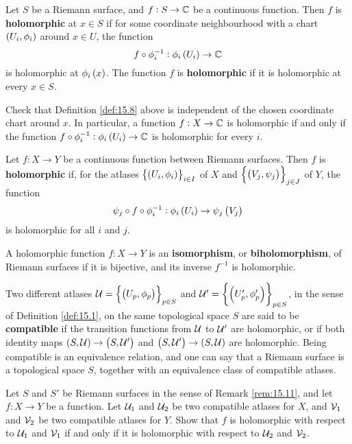 \begin{definition}
\label{def:15.8}
Let $ S $ be a Riemann surface, and $ f : S \to \mathbb{C} $ be a continuous function. Then $ f $ is \textbf{holomorphic} at $ x \in S $ if for some coordinate neighbourhood with a chart $ \br{U_i, \phi_i} $ around $ x \in U $, the function
$$ f \circ \phi_i^{-1} : \phi_i\br{U_i} \to \C $$
is holomorphic at $ \phi_i\br{x} $. The function $ f $ is \textbf{holomorphic} if it is holomorphic at every $ x \in S $.
\end{definition}

\begin{exercise}
Check that Definition \ref{def:15.8} above is independent of the chosen coordinate chart around $ x $. In particular, a function $ f : X \to \mathbb{C} $ is holomorphic if and only if the function $ f \circ \phi_i^{-1} : \phi_i\br{U_i} \to \C $ is holomorphic for every $ i $.
\end{exercise}

\begin{definition}
Let $ f : X \to Y $ be a continuous function between Riemann surfaces. Then $ f $ is \textbf{holomorphic} if, for the atlases $ \cbr{\br{U_i, \phi_i}}_{i \in I} $ of $ X $ and $ \cbr{\br{V_j, \psi_j}}_{j \in J} $ of $ Y $, the function
$$ \psi_j \circ f \circ \phi_i^{-1} : \phi_i\br{U_i} \to \psi_j\br{V_j} $$
is holomorphic for all $ i $ and $ j $.
\end{definition}

\begin{definition}
A holomorphic function $ f : X \to Y $ is an \textbf{isomorphism}, or \textbf{biholomorphism}, of Riemann surfaces if it is bijective, and its inverse $ f^{-1} $ is holomorphic.
\end{definition}

\begin{remark}
\label{rem:15.11}
Two different atlases $ \UU = \cbr{\br{U_p, \phi_p}}_{p \in S} $ and $ \UU' = \cbr{\br{U'_p, \phi'_p}}_{p \in S} $, in the sense of Definition \ref{def:15.1}, on the same topological space $ S $ are said to be \textbf{compatible} if the transition functions from $ \mathcal{U} $ to $ \mathcal{U}' $ are holomorphic, or if both identity maps $ \br{S, \UU} \to \br{S, \UU'} $ and $ \br{S, \UU'} \to \br{S, \UU} $ are holomorphic. Being compatible is an equivalence relation, and one can say that a Riemann surface is a topological space $ S $, together with an equivalence class of compatible atlases.
\end{remark}

\begin{exercise}
Let $ S $ and $ S' $ be Riemann surfaces in the sense of Remark \ref{rem:15.11}, and let $ f : X \to Y $ be a function. Let $ \mathcal{U}_1 $ and $ \mathcal{U}_2 $ be two compatible atlases for $ X $, and $ \mathcal{V}_1 $ and $ \mathcal{V}_2 $ be two compatible atlases for $ Y $. Show that $ f $ is holomorphic with respect to $ \mathcal{U}_1 $ and $ \mathcal{V}_1 $ if and only if it is holomorphic with respect to $ \mathcal{U}_2 $ and $ \mathcal{V}_2 $.
\end{exercise}

